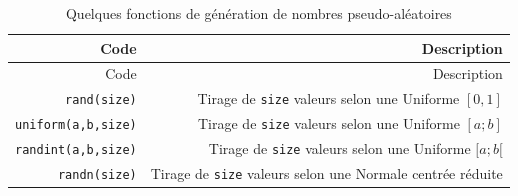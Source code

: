 \documentclass[12pt,]{book}
\numberwithin{equation}{section}
\numberwithin{countremarque}{section}
\begin{document}
\begin{longtable}[]{@{}rr@{}}
\caption{\label{tab:numpy-pseudo-aleatoires} Quelques fonctions de
génération de nombres pseudo-aléatoires}\tabularnewline
\toprule
\begin{minipage}[b]{0.18\columnwidth}\raggedleft\strut
Code\strut
\end{minipage} & \begin{minipage}[b]{0.71\columnwidth}\raggedleft\strut
Description\strut
\end{minipage}\tabularnewline
\midrule
\endfirsthead
\toprule
\begin{minipage}[b]{0.18\columnwidth}\raggedleft\strut
Code\strut
\end{minipage} & \begin{minipage}[b]{0.71\columnwidth}\raggedleft\strut
Description\strut
\end{minipage}\tabularnewline
\midrule
\endhead
\begin{minipage}[t]{0.18\columnwidth}\raggedleft\strut
\texttt{rand(size)}\strut
\end{minipage} & \begin{minipage}[t]{0.71\columnwidth}\raggedleft\strut
Tirage de \texttt{size} valeurs selon une Uniforme \([0,1]\)\strut
\end{minipage}\tabularnewline
\begin{minipage}[t]{0.18\columnwidth}\raggedleft\strut
\texttt{uniform(a,b,size)}\strut
\end{minipage} & \begin{minipage}[t]{0.71\columnwidth}\raggedleft\strut
Tirage de \texttt{size} valeurs selon une Uniforme \([a ; b]\)\strut
\end{minipage}\tabularnewline
\begin{minipage}[t]{0.18\columnwidth}\raggedleft\strut
\texttt{randint(a,b,size)}\strut
\end{minipage} & \begin{minipage}[t]{0.71\columnwidth}\raggedleft\strut
Tirage de \texttt{size} valeurs selon une Uniforme \([a ; b[\)\strut
\end{minipage}\tabularnewline
\begin{minipage}[t]{0.18\columnwidth}\raggedleft\strut
\texttt{randn(size)}\strut
\end{minipage} & \begin{minipage}[t]{0.71\columnwidth}\raggedleft\strut
Tirage de \texttt{size} valeurs selon une Normale centrée réduite\strut
\end{minipage}\tabularnewline

\end{longtable}
\end{document}
